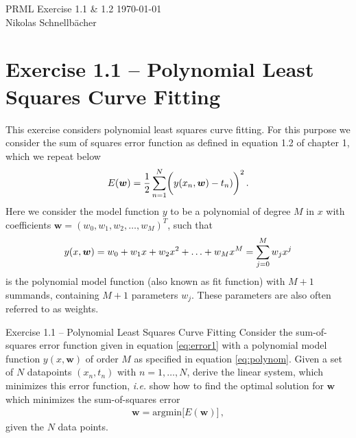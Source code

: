 \documentclass[11pt,DINA4, fleqn]{amsart}
\def\vw{\boldsymbol{w}\xspace}
\begin{document}

\tikzset{node distance=2cm, auto}





\begin{flushleft}
{\sc \Large PRML Exercise 1.1 \& 1.2} \hfill \today \\
\medskip
Nikolas Schnellbächer \underline{\hspace{6.53in}} \\
\end{flushleft}

\section*{Exercise 1.1 -- Polynomial Least Squares Curve Fitting}
This exercise considers polynomial least squares curve fitting. 
For this purpose we consider the sum of squares error function as defined in equation 1.2 of chapter 1, which we repeat below
\begin{align}
E(\vw) = \dfrac{1}{2} \sum \displaylimits_{n = 1}^{N}
\biggl(y(x_n, \vw) - t_n)\biggl)^2 \, .
\label{eq:error1}
\end{align}
Here we consider the model function $y$ to be a polynomial of degree $M$ in $x$ with coefficients $\vw = (w_0, w_1, w_2, \dots , w_M)^{T}$, such that
\begin{align}
y(x,\vw) = w_0 + w_1 x + w_2 x^2 + \dotsc + w_M x^M = \sum \displaylimits_{j = 0}^{M} w_j x^j
\label{eq:polynom}
\end{align}
is the polynomial model function (also known as fit function) with $M + 1$ summands, containing $M+1$ parameters $w_j$. These parameters are also often referred to as weights.

\begin{mybox_tc3}{Exercise 1.1 -- Polynomial Least Squares Curve Fitting}
Consider the sum-of-squares error function given in equation \eqref{eq:error1}
with a polynomial model function $y(x,\vw)$ of order $M$ as specified in equation \eqref{eq:polynom}.
Given a set of $N$ datapoints $(x_n, t_n)$ with $n = 1, \dotsc, N$,
 derive the linear system, which minimizes this
error function, \textit{i.e.} show how to find the optimal solution for $\vw$
which minimizes the sum-of-squares error
\begin{align}
\vw = \text{argmin}\biggl[ E(\vw)\biggl] \, ,
\end{align}
given the $N$ data points.
\end{mybox_tc3}
\end{document}
